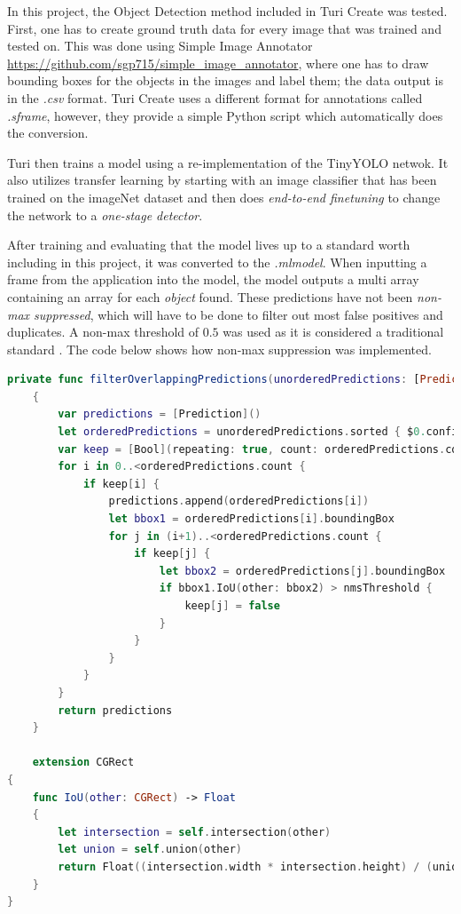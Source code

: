 In this project, the Object Detection method included in Turi Create was tested. First, one has to create ground truth data for every image that was trained and tested on. This was done using Simple Image Annotator \url{https://github.com/sgp715/simple_image_annotator}, where one has to draw bounding boxes for the objects in the images and label them; the data output is in the \textit{.csv} format.  Turi Create uses a different format for annotations called \textit{.sframe}, however, they provide a simple Python script which automatically does the conversion. 

Turi then trains a model using a re-implementation of the TinyYOLO netwok. It also utilizes transfer learning by starting with an image classifier that has been trained on the imageNet dataset and then does \textit{end-to-end finetuning} to change the network to a \textit{one-stage detector}.

After training and evaluating that the model lives up to a standard worth including in this project, it was converted to the \textit{.mlmodel}. When inputting a frame from the application into the model, the model outputs a multi array containing an array for each \textit{object} found. These predictions have not been \textit{non-max suppressed}, which will have to be done to filter out most false positives and duplicates. A non-max threshold of $0.5$ was used as it is considered a traditional standard \cite{nms}. The code below shows how non-max suppression was implemented. 

\begin{lstlisting}[language=swift]
    private func filterOverlappingPredictions(unorderedPredictions: [Prediction], nmsThreshold: Float) -> [Prediction]
    {
        var predictions = [Prediction]()
        let orderedPredictions = unorderedPredictions.sorted { $0.confidence > $1.confidence }
        var keep = [Bool](repeating: true, count: orderedPredictions.count)
        for i in 0..<orderedPredictions.count {
            if keep[i] {
                predictions.append(orderedPredictions[i])
                let bbox1 = orderedPredictions[i].boundingBox
                for j in (i+1)..<orderedPredictions.count {
                    if keep[j] {
                        let bbox2 = orderedPredictions[j].boundingBox
                        if bbox1.IoU(other: bbox2) > nmsThreshold {
                            keep[j] = false
                        }
                    }
                }
            }
        }
        return predictions
    }
    
    extension CGRect
{
    func IoU(other: CGRect) -> Float
    {
        let intersection = self.intersection(other)
        let union = self.union(other)
        return Float((intersection.width * intersection.height) / (union.width * union.height))
    }
}
\end{lstlisting}



